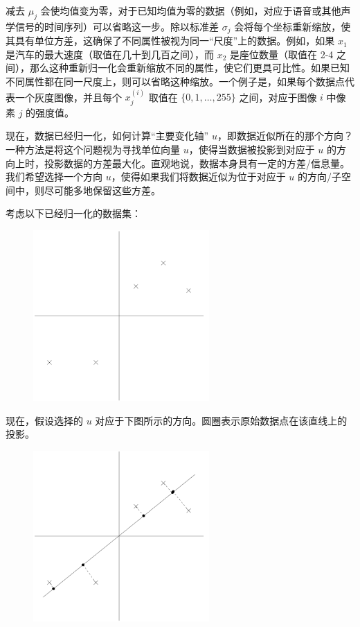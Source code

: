 减去 $\mu_j$ 会使均值变为零，对于已知均值为零的数据（例如，对应于语音或其他声学信号的时间序列）可以省略这一步。除以标准差 $\sigma_j$ 会将每个坐标重新缩放，使其具有单位方差，这确保了不同属性被视为同一“尺度”上的数据。例如，如果 $x_1$ 是汽车的最大速度（取值在几十到几百之间），而 $x_2$ 是座位数量（取值在 2-4 之间），那么这种重新归一化会重新缩放不同的属性，使它们更具可比性。如果已知不同属性都在同一尺度上，则可以省略这种缩放。一个例子是，如果每个数据点代表一个灰度图像，并且每个 $x_j^{(i)}$ 取值在 $\{0, 1, \dots, 255\}$ 之间，对应于图像 $i$ 中像素 $j$ 的强度值。

现在，数据已经归一化，如何计算“主要变化轴” $u$，即数据近似所在的那个方向？一种方法是将这个问题视为寻找单位向量 $u$，使得当数据被投影到对应于 $u$ 的方向上时，投影数据的方差最大化。直观地说，数据本身具有一定的方差/信息量。我们希望选择一个方向 $u$，使得如果我们将数据近似为位于对应于 $u$ 的方向/子空间中，则尽可能多地保留这些方差。

考虑以下已经归一化的数据集：

\begin{figure}[H]
    \centering
    \includegraphics[width=0.6\textwidth]{figs/PCA_dataset.png}
\end{figure}

现在，假设选择的 $u$ 对应于下图所示的方向。圆圈表示原始数据点在该直线上的投影。

\begin{figure}[H]
    \centering
    \includegraphics[width=0.6\textwidth]{figs/PCA_step1.png}
\end{figure}

